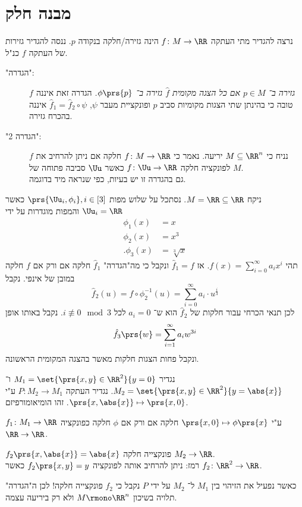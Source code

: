 \documentclass[a4paper,10pt,twoside,openany]{book}
\begin{document}
\section{מבנה חלק}
נרצה להגדיר מתי העתקה
$f \colon M \to \RR$
הינה גזירה/חלקה בנקודה
$p$.
ננסה להגדיר גזירות של העתקה
$f$
כנ"ל.
\begin{description}
\item["הגדרה":]
\emph{$f$
גזירה ב־%
$p \in M$
אם כל הצגה מקומית
$\hat{f}$
גזירה ב־%
$\phi\prs{p}$.}
הגדרה זאת איננה טובה כי בהינתן שתי הצגות מקומיות סביב
$p$
ופונקציית מעבר
$\psi$,
$\hat{f}_1 = \hat{f}_2 \circ \psi$
איננה בהכרח גזירה.

\item["הגדרה 2":]
נניח כי
$M \subseteq \RR^n$
יריעה. נאמר כי
$f \colon M \to \RR$
חלקה אם ניתן להרחיב את
$f$
לפונקציה חלקה
$f \colon \Uu \to \RR$
כאשר
$\Uu$
סביבה פתוחה של
$M$.
\\
גם בהגדרה זו יש בעיות, כפי שנראה מיד בדוגמה.
\end{description}
\begin{example}
ניקח
$M = \RR \subseteq \RR$.
נסתכל על שלוש מפות
$\prs{\Uu_i, \phi_i}, i \in [3]$
כאשר
$\Uu_i = \RR$
והמפות מוגדרות על ידי
\begin{align*}
\phi_1(x) &= x \\
\phi_2(x) &= x^3 \\
\text{.} \phi_3(x) &= \sqrt[3]{x}
\end{align*}
תהי
$f(x) = \sum_{i=0}^{\infty} a_i x^i$.
אז
$\hat{f}_1 = f$
ונקבל כי מה"הגדרה"
$\hat{f}_1$
חלקה אם ורק אם
$f$
חלקה במובן של אינפי.
נקבל
\[\hat{f}_2(u) = f\circ \phi_2^{-1}(u) = \sum_{i=0}^{\infty} a_i \cdot u^{\frac{i}{3}}\]
לכן תנאי הכרחי עבור חלקות של
$\hat{f}_2$
הוא ש־%
$a_i = 0$
לכל
$i \not\equiv 0 \mod{3}$.
נקבל באותו אופן
\[\hat{f}_3\prs{w} = \sum_{i=1}^{\infty} a_i w^{3i}\]
ונקבל פחות הצגות חלקות מאשר בהצגה המקומית הראשונה.
\end{example}
\begin{example}
נגדיר
$M_1 = \set{\prs{x,y} \in \RR^2}{y=0}$
ו־%
$M_2 = \set{\prs{x,y} \in \RR^2}{y=\abs{x}}$.
נגדיר העתקה
$P \colon M_2 \to M_1$
ע"י
$\prs{x,\abs{x}} \mapsto \prs{x,0}$.
זהו הומיאומורפיזם.
\begin{exercise}
$f_1 \colon M_1 \to \RR$
ע"י
$\prs{x,0} \mapsto \phi\prs{x}$
חלקה אם ורק אם
$\phi$
חלקה כפונקציה
$\RR \to \RR$.
\end{exercise}
\begin{exercise}
$f_2\prs{x, \abs{x}} = \abs{x}$
פונקצייה חלקה
$M_2 \to \RR$.\\
רמז: ניתן להרחיב אותה לפונקציה
$f_2\prs{x,y} = y$
כאשר
$f_2 \colon \RR^2 \to \RR$.
\end{exercise}
כאשר נפעיל את הזיהוי בין
$M_1$
ל־%
$M_2$
על ידי
$P$
נקבל כי
$f_2$
פונקצייה חלקה!
לכן ה"הגדרה" תלויה בשיכון
$M \rmono \RR^n$
ולא רק ביריעה עצמה.
\end{example}
\end{document}
